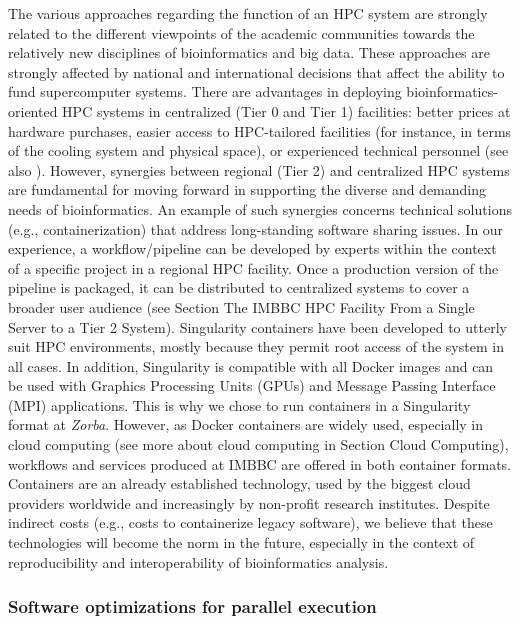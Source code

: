    The various approaches regarding the function of an HPC system are strongly related to the different viewpoints of the academic communities towards the relatively new disciplines of bioinformatics and big data. 
   These approaches are strongly affected by national and international decisions that affect the ability to fund supercomputer systems. 
   There are advantages in deploying bioinformatics-oriented HPC systems in centralized (Tier 0 and Tier 1) facilities: 
   better prices at hardware purchases, easier access to HPC-tailored facilities (for instance, in terms of the cooling system and physical space), or experienced technical personnel 
   (see also \citep{lampa2013lessons}). 
   However, synergies between regional (Tier 2) and centralized HPC systems are fundamental for moving forward in supporting the diverse and demanding needs of bioinformatics. 
   An example of such synergies concerns technical solutions (e.g., containerization) that address long-standing software sharing issues. 
   In our experience, a workflow/pipeline can be developed by experts within the context of a specific project in a regional HPC facility. Once a production version of the pipeline is packaged, it can be distributed to centralized systems to cover a broader user audience (see Section The IMBBC HPC Facility From a Single Server to a Tier 2 System). 
   Singularity containers have been developed to utterly suit HPC environments, mostly because they permit root access of the system in all cases. 
   In addition, Singularity is compatible with all Docker images and can be used with Graphics Processing Units (GPUs) and Message Passing Interface (MPI) applications. This is why we chose to run containers in a Singularity format at \textit{Zorba}. 
   However, as Docker containers are widely used, especially in cloud computing (see more about cloud computing in Section Cloud Computing), workflows and services produced at IMBBC are offered in both container formats. 
   Containers are an already established technology, used by the biggest cloud providers worldwide and increasingly by non-profit research institutes. Despite indirect costs (e.g., costs to containerize legacy software), we believe that these technologies will become the norm in the future, especially in the context of reproducibility and interoperability of bioinformatics analysis.


   \subsubsection*{Software optimizations for parallel execution}

